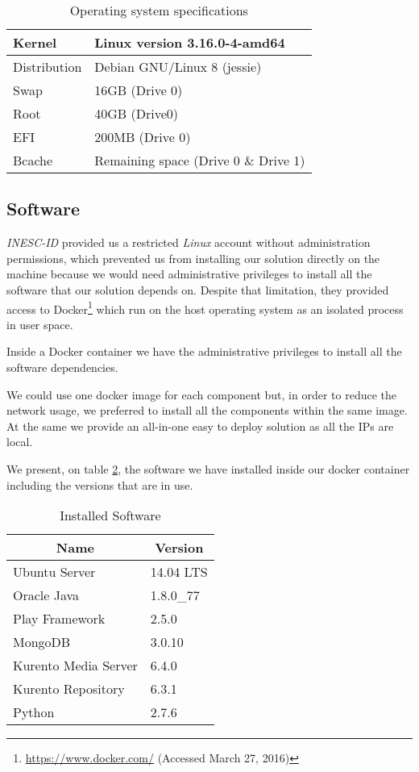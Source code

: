 	\begin{table}
\centering
\caption{Operating system specifications}
\label{table:osspecs}
\begin{tabular}{|l|l|}
\hline
Kernel & Linux version 3.16.0-4-amd64 \\ \hline
Distribution & Debian GNU/Linux 8 (jessie)\footnotemark \\ \hline
Swap & 16GB (Drive 0)\\ \hline
Root & 40GB (Drive0)\\ \hline
EFI & 200MB (Drive 0)\\ \hline
Bcache & Remaining space (Drive 0 \& Drive 1) \\ \hline
\end{tabular}
\end{table}


\subsection{Software}
	\emph{INESC-ID} provided us a restricted \emph{Linux} account without administration permissions, which prevented us from installing our solution directly on the machine because we would need administrative privileges to install all the software that our solution depends on. Despite that limitation, they provided access to Docker\footnote{\url{https://www.docker.com/} (Accessed March 27, 2016)} which run on the host operating system as an isolated process in user space.

	Inside a Docker container we have the administrative privileges to install all the software dependencies.

	We could use one docker image for each component but, in order to reduce the network usage, we preferred to install all the components within the same image. At the same we provide an all-in-one easy to deploy solution as all the \ac{IP}s are local.

	We present, on table \ref{table:softspecs}, the software we have installed inside our docker container including the versions that are in use.

	\begin{table}
\centering
\caption{Installed Software}
\label{table:softspecs}
\begin{tabular}{|l|l|}
\hline
\multicolumn{1}{|c|}{\textbf{Name}} & \multicolumn{1}{c|}{\textbf{Version}}         \\ \hline
Ubuntu Server\footnotemark & 14.04 LTS   \\ \hline
Oracle Java & 1.8.0\_77   \\ \hline
Play Framework & 2.5.0  \\ \hline
MongoDB & 3.0.10   \\ \hline
Kurento Media Server & 6.4.0 \\ \hline
Kurento Repository & 6.3.1 \\ \hline
Python & 2.7.6 \\ \hline
\end{tabular}
\end{table}



